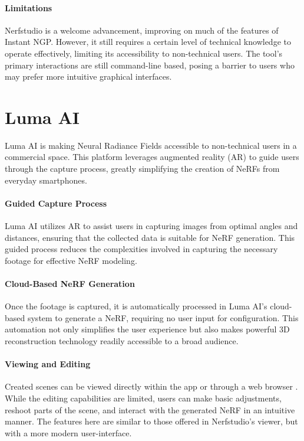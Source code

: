 \paragraph{Limitations}
Nerfstudio is a welcome advancement, improving on much of the features of Instant NGP. 
However, it still requires a certain level of technical knowledge to operate effectively, limiting its accessibility to non-technical users.
The tool's primary interactions are still command-line based, posing a barrier to users who may prefer more intuitive graphical interfaces.

\section{Luma AI}
\label{sec:related:luma}

Luma AI \cite{noauthor_luma_nodate} is making Neural Radiance Fields accessible to non-technical users in a commercial space.
This platform leverages augmented reality (AR) to guide users through the capture process, greatly simplifying the creation of NeRFs from everyday smartphones.

\paragraph{Guided Capture Process}
Luma AI utilizes AR to assist users in capturing images from optimal angles and distances, ensuring that the collected data is suitable for NeRF generation.
This guided process reduces the complexities involved in capturing the necessary footage for effective NeRF modeling.

\paragraph{Cloud-Based NeRF Generation}
Once the footage is captured, it is automatically processed in Luma AI’s cloud-based system to generate a NeRF, requiring no user input for configuration.
This automation not only simplifies the user experience but also makes powerful 3D reconstruction technology readily accessible to a broad audience.

\paragraph{Viewing and Editing}
Created scenes can be viewed directly within the app or through a web browser . 
While the editing capabilities are limited, users can make basic adjustments, reshoot parts of the scene, and interact with the generated NeRF in an intuitive manner.
The features here are similar to those offered in Nerfstudio's viewer, but with a more modern user-interface.

